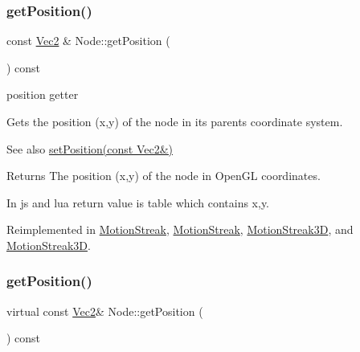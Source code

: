 \subsubsection{\texorpdfstring{get\+Position()}{getPosition()}\hspace{0.1cm}{\footnotesize\ttfamily [1/4]}}
{\footnotesize\ttfamily const \hyperlink{classVec2}{Vec2} \& Node\+::get\+Position (\begin{DoxyParamCaption}{ }\end{DoxyParamCaption}) const\hspace{0.3cm}{\ttfamily [virtual]}}



position getter 

Gets the position (x,y) of the node in its parent\textquotesingle{}s coordinate system.

\begin{DoxySeeAlso}{See also}
\hyperlink{classNode_a8ffbf25763ef5f15eeae7227779505bc}{set\+Position(const Vec2\&)}
\end{DoxySeeAlso}
\begin{DoxyReturn}{Returns}
The position (x,y) of the node in Open\+GL coordinates. 
\begin{DoxyCode}
In js and lua \textcolor{keywordflow}{return} value is table which contains x,y.
\end{DoxyCode}
 
\end{DoxyReturn}


Reimplemented in \hyperlink{classMotionStreak_a73f3dcb75380855a39c6ff9eee475d80}{Motion\+Streak}, \hyperlink{classMotionStreak_ae5dbfd01e4931044ac764dd43c6fbf30}{Motion\+Streak}, \hyperlink{classMotionStreak3D_a17b236b952ac5670676b2b50a0fab421}{Motion\+Streak3D}, and \hyperlink{classMotionStreak3D_a5c9d70a707ecdaf49d8793ae6e4bce7e}{Motion\+Streak3D}.

\mbox{\label{classNode_a47e9123d87921aefc06960a5089c995d}} 
\subsubsection{\texorpdfstring{get\+Position()}{getPosition()}\hspace{0.1cm}{\footnotesize\ttfamily [2/4]}}
{\footnotesize\ttfamily virtual const \hyperlink{classVec2}{Vec2}\& Node\+::get\+Position (\begin{DoxyParamCaption}{ }\end{DoxyParamCaption}) const\hspace{0.3cm}{\ttfamily [virtual]}}


